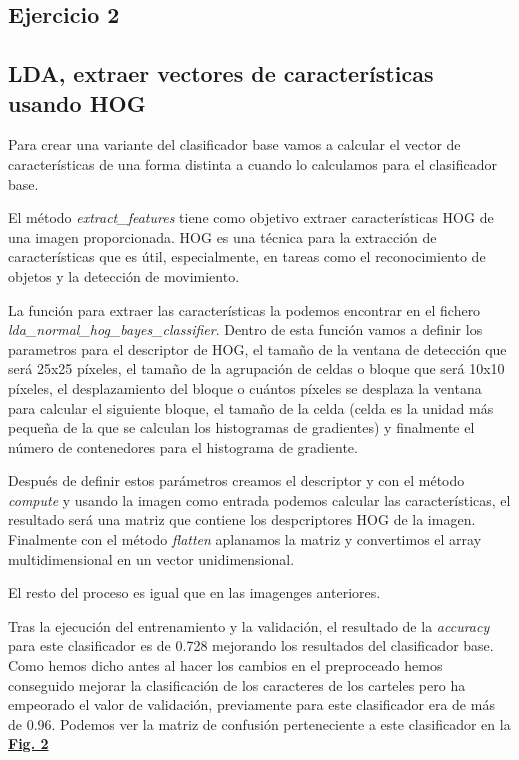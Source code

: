 \documentclass[a4paper, 12pt]{article}
\begin{document}
\subsection{Ejercicio 2}

\subsection{LDA, extraer vectores de características usando HOG}
Para crear una variante del clasificador base vamos a calcular el vector de características de una forma distinta a cuando lo calculamos para el clasificador base. 

El método \textit{extract\_features} tiene como objetivo extraer características HOG de una imagen proporcionada. HOG es una técnica para la extracción de características que es útil, especialmente, en tareas como el reconocimiento de objetos y la detección de movimiento.

La función para extraer las características la podemos encontrar en el fichero \textit{lda\_normal\_hog\_bayes\_classifier}. Dentro de esta función vamos a definir los parametros para el descriptor de HOG, el tamaño de la ventana de detección que será 25x25 píxeles, el tamaño de la agrupación de celdas o bloque que será 10x10 píxeles, el desplazamiento del bloque o cuántos píxeles se desplaza la ventana para calcular el siguiente bloque, el tamaño de la celda (celda es la unidad más pequeña de la que se calculan los histogramas de gradientes) y finalmente el número de contenedores para el histograma de gradiente. 

Después de definir estos parámetros creamos el descriptor y con el método \textit{compute} y usando la imagen como entrada podemos calcular las características, el resultado será una matriz que contiene los despcriptores HOG de la imagen. Finalmente con el método \textit{flatten} aplanamos la matriz y convertimos el array multidimensional en un vector unidimensional. 

El resto del proceso es igual que en las imagenges anteriores. 

Tras la ejecución del entrenamiento y la validación, el resultado de la \textit{accuracy} para este clasificador es de 0.728 mejorando los resultados del clasificador base. Como hemos dicho antes al hacer los cambios en el preproceado hemos conseguido mejorar la clasificación de los caracteres de los carteles pero ha empeorado el valor de validación, previamente para este clasificador era de más de 0.96. Podemos ver la matriz de confusión perteneciente a este clasificador en la  \textbf{\hyperref[fig:normalizacion]{Fig. 2}}
\end{document}
